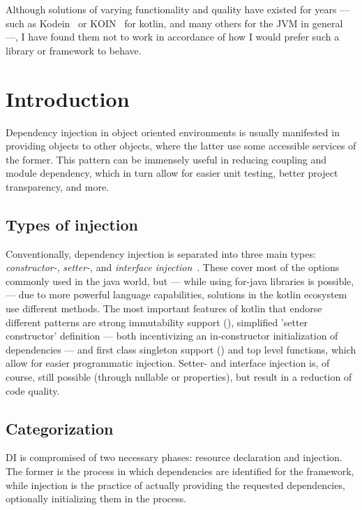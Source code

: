 Although solutions of varying functionality and quality have existed for years --- such as Kodein~\cite{Kodein} or KOIN~\cite{KOIN} for kotlin, and many others for the JVM in general~\cite{JavaCdi} ---, I have found them not to work in accordance of how I would prefer such a library or framework to behave.

	\section{Introduction}
	
	Dependency injection in object oriented environments is usually manifested in providing objects to other objects, where the latter use some accessible services of the former. This pattern can be immensely useful in reducing coupling and module dependency, which in turn allow for easier unit testing, better project transparency, and more.
	
		\subsection*{Types of injection}
		
		Conventionally, dependency injection is separated into three main types: \emph{constructor-}, \emph{setter-}, and \emph{interface injection}~\cite{DiTypes}. These cover most of the options commonly used in the java world, but --- while using for-java libraries is possible, --- due to more powerful language capabilities, solutions in the kotlin ecosystem use different methods. The most important features of kotlin that endorse different patterns are strong immutability support (), simplified 'setter constructor' definition --- both incentivizing an in-constructor initialization of dependencies --- and first class singleton support () and top level functions, which allow for easier programmatic injection. Setter- and interface injection is, of course, still possible (through nullable or  properties), but result in a reduction of code quality.
		
		\subsection*{Categorization}
	
		DI is compromised of two necessary phases: resource declaration and injection. The former is the process in which dependencies are identified for the framework, while injection is the practice of actually providing the requested dependencies, optionally initializing them in the process.
		
